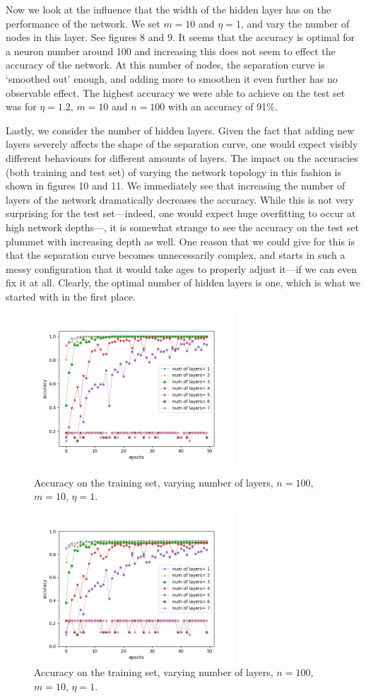 \documentclass[11pt]{article}
\begin{document}
Now we look at the influence that the width of the hidden layer has on the performance of the network. We set $m=10$ and $\eta=1$, and vary the number of nodes in this layer. See figures 8 and 9. It seems that the accuracy is optimal for a neuron number around 100 and increasing this does not seem to effect the accuracy of the network. At this number of nodes, the separation curve is `smoothed out' enough, and adding more to smoothen it even further has no observable effect. The highest accuracy we were able to achieve on the test set was for $\eta=1.2$, $m=10$ and $n=100$ with an accuracy of 91\%.\par
Lastly, we consider the number of hidden layers. Given the fact that adding new layers severely affects the shape of the separation curve, one would expect visibly different behaviours for different amounts of layers. The impact on the accuracies (both training and test set) of varying the network topology in this fashion is shown in figures 10 and 11. We immediately see that increasing the number of layers of the network dramatically decreases the accuracy. While this is not very surprising for the test set---indeed, one would expect huge overfitting to occur at high network depths---, it is somewhat strange to see the accuracy on the test set plummet with increasing depth as well. One reason that we could give for this is that the separation curve becomes unnecessarily complex, and starts in such a messy configuration that it would take ages to properly adjust it---if we can even fix it at all. Clearly, the optimal number of hidden layers is one, which is what we started with in the first place.
\begin{figure}[!t]
\centering
\parbox{6cm}{
\includegraphics[width=7.5cm]{delta_layers_train.png}
\caption{Accuracy on the training set, varying number of layers, $n=100$, $m=10$, $\eta=1$.}
}
\qquad
\begin{minipage}{6cm}
\includegraphics[width=7.5cm]{delta_layers_test.png}
\caption{Accuracy on the training set, varying number of layers, $n=100$, $m=10$, $\eta=1$.}
\end{minipage}
\end{figure}
\end{document}
